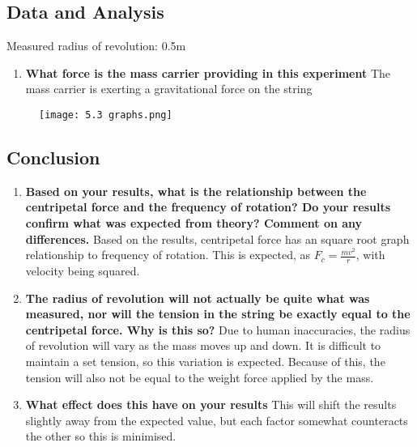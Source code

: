 	\subsection{Data and Analysis}
		Measured radius of revolution: 0.5m
		\begin{enumerate}
			\item \textbf{What force is the mass carrier providing in this experiment}
				\subitem The mass carrier is exerting a gravitational force on the string
		\end{enumerate}

		\begin{figure}[H]
			\centering
			\texttt{[image: 5.3 graphs.png]}
		\end{figure}

	\subsection{Conclusion}
		\begin{enumerate}
			\item \textbf{Based on your results, what is the relationship between the centripetal force and the frequency of rotation? Do your results confirm what was expected from theory? Comment on any differences.}
				\subitem Based on the results, centripetal force has an square root graph relationship to frequency of rotation. This is expected, as $F_{c}=\frac{mv^2}{r}$, with velocity being squared.
			\item \textbf{The radius of revolution will not actually be quite what was measured, nor will the tension in the string be exactly equal to the centripetal force. Why is this so?}
				\subitem Due to human inaccuracies, the radius of revolution will vary as the mass moves up and down. It is difficult to maintain a set tension, so this variation is expected. Because of this, the tension will also not be equal to the weight force applied by the mass.
			\item \textbf{What effect does this have on your results}
				\subitem This will shift the results slightly away from the expected value, but each factor somewhat counteracts the other so this is minimised.
		\end{enumerate}

